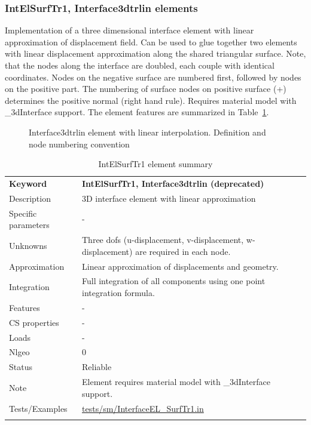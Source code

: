 \documentclass[a4paper]{article}
\newcommand{\param}[1]{\texttt{#1}} %
\newcommand{\templabel}{}%
\newcommand{\tempcaption}{}%
\newcounter{nelpar}
\newenvironment{elementsummary}[5]{%
  \gdef\tempcaption{#4}%
  \gdef\templabel{#5}%
  \setcounter{nelpar}{0}%
  \begin{center} %
    \begin{table}[!htb] %
      \begin{tabular}{|l|p{9cm}|}\hline %
        {\bf Keyword} & \bf{#1}\\ %
        {Description} & {#2}\\ %
        {Specific parameters} & {#3}\\ \hline %
}{
  \\ \hline %
      \end{tabular}%
      \caption{\tempcaption}%
      \label{\templabel}%
    \end{table}%
  \end{center}%
}
\newcommand{\elementParam}[1]{%
  \ifthenelse{\value{nelpar}>0} %
             {&{#1}}%
             {\setcounter{nelpar}{1}Parameters&{#1}}%
             \\%
}
\newcommand{\elementDescription}[2]{{#1} & {#2}\\}
\begin{document}
\subsubsection{IntElSurfTr1, Interface3dtrlin elements}
Implementation of a three dimensional interface element with linear
approximation of displacement field. Can be used to glue together two elements with linear displacement approximation along the shared triangular surface. Note, that the nodes along the interface are doubled, each couple with identical coordinates. Nodes on the negative surface are numbered first, followed by nodes on the positive part. The numbering of surface nodes on positive surface (+) determines the positive normal (right hand rule). Requires material model with \_3dInterface support. The element features are summarized in Table~\ref{Interface3dtrlinsummary}.

\begin{figure}[htb]
 \centering
 \begin{makeimage}
  
 \end{makeimage}
 \caption{Interface3dtrlin element with linear interpolation. Definition and node numbering convention}
 \label{interf3d_lin_fig}
\end{figure}

\begin{elementsummary}{IntElSurfTr1, Interface3dtrlin (deprecated)}{3D  interface element with linear approximation}{-}{IntElSurfTr1 element summary}{Interface3dtrlinsummary}
\elementDescription{Unknowns}{Three dofs (u-displacement, v-displacement, w-displacement) are required in each node.}
\elementDescription{Approximation}{Linear approximation of displacements and geometry.}
\elementDescription{Integration}{Full integration of all components using one point integration formula.}
\elementDescription{Features}{-}
\elementDescription{CS properties}{-}
\elementDescription{Loads}{-}
\elementDescription{Nlgeo}{0}
\elementDescription{Status}{Reliable}
\elementDescription{Note}{Element requires material model with \_3dInterface support.}
\elementDescription{Tests/Examples}{\href{https://github.com/oofem/oofem/blob/devel/tests/sm/InterfaceEL\_SurfTr1.in}{tests/sm/InterfaceEL\_SurfTr1.in}}
\end{elementsummary}
\end{document}
